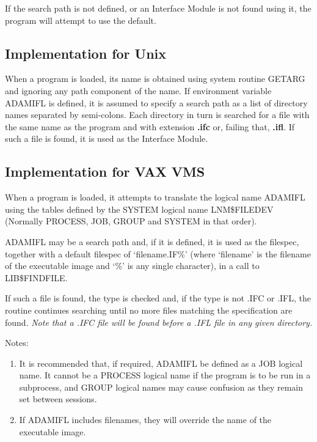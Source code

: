 \documentclass[twoside,11pt]{article}
\newcommand{\xlabel}[1]{}
\renewcommand{\_}{\texttt{\symbol{95}}}
\begin{document}
If the search path is not defined, or an Interface Module is not found using
it, the program will attempt to use the default.

\subsection{Implementation for Unix\xlabel{implementation_for_unix}}

When a program is loaded, its name is obtained using system routine GETARG and
ignoring any path component of the name.
If environment variable ADAM\_IFL is defined, it is
assumed to specify a search path as a list of directory names separated by
semi-colons.
Each directory in turn is searched for a file with the same name
as the program and with extension {\bf .ifc} or, failing that, {\bf .ifl}.
If such a file is found, it is used as the Interface Module.

\subsection{Implementation for VAX VMS\xlabel{implementation_for_vax_vms}}

When a program is loaded, it attempts to translate the logical name ADAM\_IFL
using the tables defined by the SYSTEM logical name LNM\$FILE\_DEV (Normally
PROCESS, JOB, GROUP and SYSTEM in that order).

ADAM\_IFL may be a search path and, if it is defined, it is used as the
filespec, together with a default filespec of `filename.IF\%' (where
`filename' is the filename of the executable image and `\%' is any single
character), in a call to LIB\$FIND\_FILE.

If such a file is found, the type is checked and, if the type is not .IFC
or .IFL, the routine continues searching until no more files matching
the specification are found.
{\em Note that a .IFC file will be found before a .IFL file in any given
directory.}

Notes:
\begin{enumerate}
\item It is recommended that, if required, ADAM\_IFL be defined as a JOB
logical name.
It cannot be a PROCESS logical name if the program is to be run in a
subprocess, and GROUP logical names may cause confusion as they remain set
between sessions.
\item If ADAM\_IFL includes filenames, they will override the name of the
executable image.
\end{enumerate}
\end{document}
